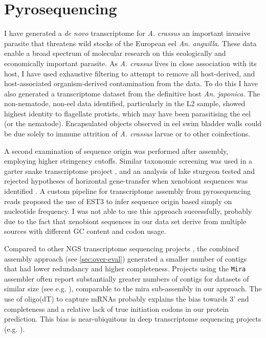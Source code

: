 \section{Pyrosequencing}
\label{sec:454-pyr}

I have generated a \textit{de novo} transcriptome for \textit{A. crassus} an
important invasive parasite that threatens wild stocks of the European
eel \textit{An. anguilla}. These data enable a broad spectrum of
molecular research on this ecologically and economically important
parasite. As \textit{A. crassus} lives in close association with its
host, I have used exhaustive filtering to attempt to remove all
host-derived, and host-associated organism-derived contamination from
the data. To do this I have also generated a transcriptome dataset
from the definitive host \textit{An. japonica}. The non-nematode,
non-eel data identified, particularly in the L2 sample, showed highest
identity to flagellate protists, which may have been parasitising the
eel (or the nematode). Encapsulated objects observed in eel swim
bladder walls \cite{heitlinger_massive_2009} could be due solely to
immune attrition of \textit{A. crassus} larvae or to other
coinfections.

A second examination of sequence origin was performed after assembly,
employing higher stringency cutoffs. Similar taxonomic screening was
used in a garter snake transcriptome project \cite{pmid21138572}, and
an analysis of lake sturgeon tested and rejected hypotheses of
horizontal gene-transfer when xenobiont sequences was identified
\cite{pmid20386959}. A custom pipeline for transcriptome assembly from
pyrosequencing reads \cite{pmid20034392} proposed the use of EST3
\cite{pmid17218127} to infer sequence origin based simply on
nucleotide frequency. I was not able to use this approach
successfully, probably due to the fact that xenobiont sequences in our
data set derive from multiple sources with different GC content and
codon usage.

Compared to other NGS transcriptome sequencing projects
\cite{pmid20478048}, the combined assembly approach (see
\ref{sec:over-eval}) generated a smaller number of contigs that had
lower redundancy and higher completeness. Projects using the
\texttt{Mira} assembler often report substantially greater numbers of
contigs for datasets of similar size (see e.g. \cite{pmid21364769}),
comparable to the mira sub-assembly in our approach. The use of
oligo(dT) to capture mRNAs probably explains the bias towards 3' end
completeness and a relative lack of true initiation codons in our
protein prediction. This bias is near-ubiquitous in deep transcriptome
sequencing projects (e.g. \cite{pmid20331785}).


